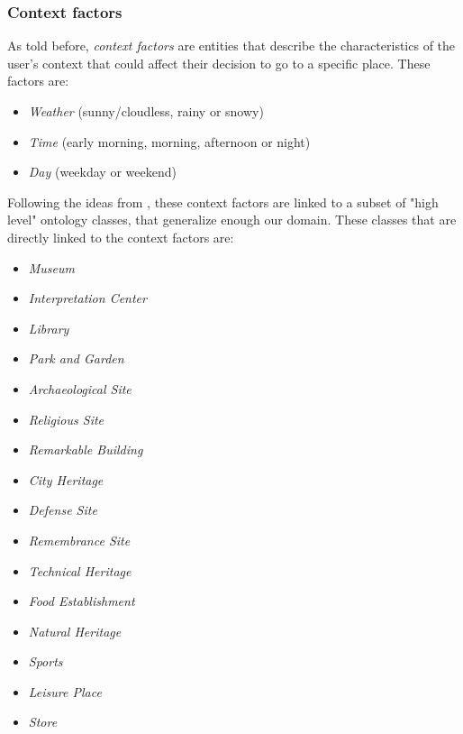 \subsubsection{Context factors} \label{section:context_factors}
As told before, \textit{context factors} are entities that describe the characteristics of the user's context that could affect their decision to go to a specific place. These factors are: 
\begin{itemize}
    \item \textit{Weather} (sunny/cloudless, rainy or snowy)
    \item \textit{Time} (early morning, morning, afternoon or night)
    \item \textit{Day} (weekday or weekend)
\end{itemize}
Following the ideas from \cite{bahramian_abbaspour_claramunt_2017}, these context factors are linked to a subset of "high level" ontology classes, that generalize enough our domain. These classes that are directly linked to the context factors are:
\begin{itemize}
    \item \textit{Museum}
    \item \textit{Interpretation Center}
    \item \textit{Library}
    \item \textit{Park and Garden}
    \item \textit{Archaeological Site}
    \item \textit{Religious Site}
    \item \textit{Remarkable Building}
    \item \textit{City Heritage}
    \item \textit{Defense Site}
    \item \textit{Remembrance Site}
    \item \textit{Technical Heritage}
    \item \textit{Food Establishment}
    \item \textit{Natural Heritage}
    \item \textit{Sports}
    \item \textit{Leisure Place}
    \item \textit{Store}
\end{itemize}
 
